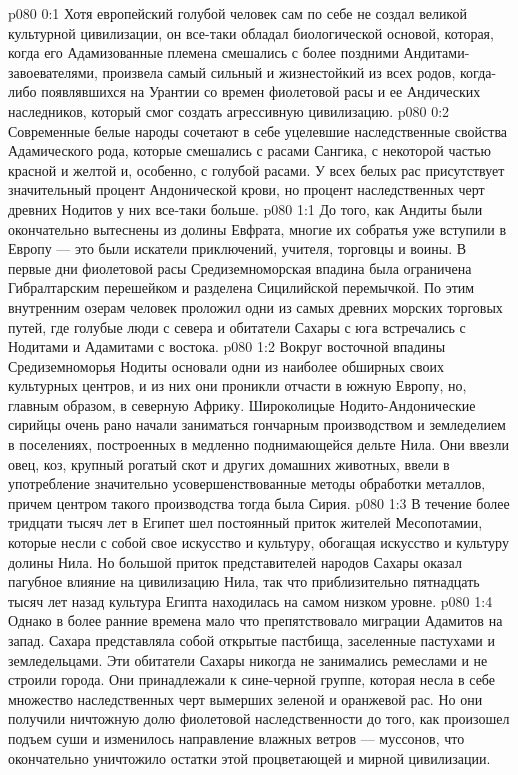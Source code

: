 \author{Архангел}
\vs p080 0:1 Хотя европейский голубой человек сам по себе не создал великой культурной цивилизации, он все\hyp{}таки обладал биологической основой, которая, когда его Адамизованные племена смешались с более поздними Андитами\hyp{}завоевателями, произвела самый сильный и жизнестойкий из всех родов, когда\hyp{}либо появлявшихся на Урантии со времен фиолетовой расы и ее Андических наследников, который смог создать агрессивную цивилизацию.
\vs p080 0:2 Современные белые народы сочетают в себе уцелевшие наследственные свойства Адамического рода, которые смешались с расами Сангика, с некоторой частью красной и желтой и, особенно, с голубой расами. У всех белых рас присутствует значительный процент Андонической крови, но процент наследственных черт древних Нодитов у них все\hyp{}таки больше.
\vs p080 1:1 До того, как Андиты были окончательно вытеснены из долины Евфрата, многие их собратья уже вступили в Европу --- это были искатели приключений, учителя, торговцы и воины. В первые дни фиолетовой расы Средиземноморская впадина была ограничена Гибралтарским перешейком и разделена Сицилийской перемычкой. По этим внутренним озерам человек проложил одни из самых древних морских торговых путей, где голубые люди с севера и обитатели Сахары с юга встречались с Нодитами и Адамитами с востока.
\vs p080 1:2 Вокруг восточной впадины Средиземноморья Нодиты основали одни из наиболее обширных своих культурных центров, и из них они проникли отчасти в южную Европу, но, главным образом, в северную Африку. Широколицые Нодито\hyp{}Андонические сирийцы очень рано начали заниматься гончарным производством и земледелием в поселениях, построенных в медленно поднимающейся дельте Нила. Они ввезли овец, коз, крупный рогатый скот и других домашних животных, ввели в употребление значительно усовершенствованные методы обработки металлов, причем центром такого производства тогда была Сирия.
\vs p080 1:3 В течение более тридцати тысяч лет в Египет шел постоянный приток жителей Месопотамии, которые несли с собой свое искусство и культуру, обогащая искусство и культуру долины Нила. Но большой приток представителей народов Сахары оказал пагубное влияние на цивилизацию Нила, так что приблизительно пятнадцать тысяч лет назад культура Египта находилась на самом низком уровне.
\vs p080 1:4 Однако в более ранние времена мало что препятствовало миграции Адамитов на запад. Сахара представляла собой открытые пастбища, заселенные пастухами и земледельцами. Эти обитатели Сахары никогда не занимались ремеслами и не строили города. Они принадлежали к сине\hyp{}черной группе, которая несла в себе множество наследственных черт вымерших зеленой и оранжевой рас. Но они получили ничтожную долю фиолетовой наследственности до того, как произошел подъем суши и изменилось направление влажных ветров --- муссонов, что окончательно уничтожило остатки этой процветающей и мирной цивилизации.
